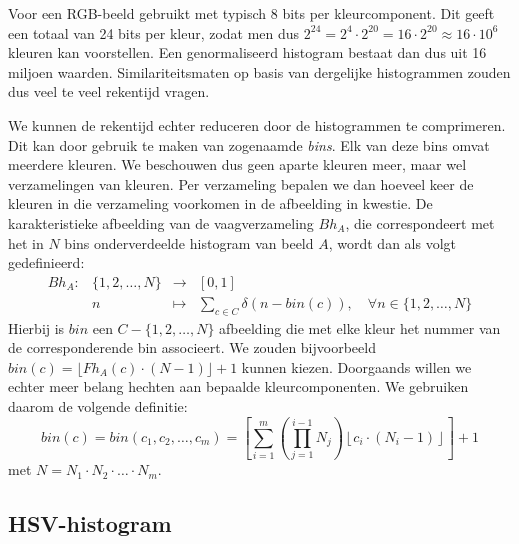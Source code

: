 Voor een RGB-beeld gebruikt met typisch 8 bits per kleurcomponent. Dit geeft een totaal van
24 bits per kleur, zodat men dus $2^{24}=2^4 \cdot 2^{20}=16 \cdot 2^{20} \approx 16 \cdot 10^6$
kleuren kan voorstellen. Een genormaliseerd histogram bestaat dan dus uit 16 miljoen waarden.
Similariteitsmaten op basis van dergelijke histogrammen zouden dus veel te veel rekentijd vragen.

We kunnen de rekentijd echter reduceren door de histogrammen te comprimeren. Dit kan door gebruik te 
maken van zogenaamde \emph{bins}. Elk van deze bins omvat meerdere kleuren. We beschouwen dus 
geen aparte kleuren meer, maar wel verzamelingen van kleuren. Per verzameling bepalen we dan 
hoeveel keer de kleuren in die verzameling voorkomen 
in de afbeelding in kwestie. De karakteristieke afbeelding van de vaagverzameling $Bh_A$, die
correspondeert met het in $N$ bins onderverdeelde histogram van beeld $A$, wordt dan als volgt
gedefinieerd:  
$$
\begin{array}{lrcl}
Bh_A: 	& \{1,2,\ldots,N\} 	& \to 		& [0,1] \\[5pt]
		& n						& \mapsto	& \displaystyle\sum_{c \in C} \delta (n -  bin(c)),
\quad\forall n \in \{1,2,\ldots,N\}
\end{array}
$$
Hierbij is $bin$ een $C - \{1,2,\ldots,N\}$ afbeelding die met elke kleur het nummer van de 
corresponderende bin associeert. We zouden bijvoorbeeld 
$bin(c) = \lfloor Fh_A(c) \cdot (N-1) \rfloor + 1$ kunnen kiezen. Doorgaands willen we echter
meer belang hechten aan bepaalde kleurcomponenten. We gebruiken daarom de volgende definitie:
$$
bin(c) = bin(c_1,c_2,\ldots,c_m) = \left[ \sum_{i=1}^m \left( \prod_{j=1}^{i-1} N_j \right) \left\lfloor c_i \cdot (N_i - 1) \right\rfloor \right] + 1
$$
met $N=N_1 \cdot N_2 \cdot \ldots \cdot N_m$.

\subsection{HSV-histogram}

